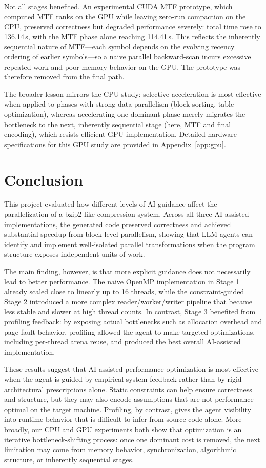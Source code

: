 \documentclass[conference]{IEEEtran}
\begin{document}
Not all stages benefited. An experimental CUDA MTF prototype, which computed MTF ranks on the GPU while leaving zero-run compaction on the CPU, preserved correctness but degraded performance severely: total time rose to 136.14\,s, with the MTF phase alone reaching 114.41\,s. This reflects the inherently sequential nature of MTF---each symbol depends on the evolving recency ordering of earlier symbols---so a naive parallel backward-scan incurs excessive repeated work and poor memory behavior on the GPU. The prototype was therefore removed from the final path.

The broader lesson mirrors the CPU study: selective acceleration is most effective when applied to phases with strong data parallelism (block sorting, table optimization), whereas accelerating one dominant phase merely migrates the bottleneck to the next, inherently sequential stage (here, MTF and final encoding), which resists efficient GPU implementation. Detailed hardware specifications for this GPU study are provided in Appendix~\ref{app:gpu}.

\section{Conclusion}
This project evaluated how different levels of AI guidance affect the parallelization of a bzip2-like compression system. Across all three AI-assisted implementations, the generated code preserved correctness and achieved substantial speedup from block-level parallelism, showing that LLM agents can identify and implement well-isolated parallel transformations when the program structure exposes independent units of work.

The main finding, however, is that more explicit guidance does not necessarily lead to better performance. The naive OpenMP implementation in Stage 1 already scaled close to linearly up to 16 threads, while the constraint-guided Stage 2 introduced a more complex reader/worker/writer pipeline that became less stable and slower at high thread counts. In contrast, Stage 3 benefited from profiling feedback: by exposing actual bottlenecks such as allocation overhead and page-fault behavior, profiling allowed the agent to make targeted optimizations, including per-thread arena reuse, and produced the best overall AI-assisted implementation.

These results suggest that AI-assisted performance optimization is most effective when the agent is guided by empirical system feedback rather than by rigid architectural prescriptions alone. Static constraints can help ensure correctness and structure, but they may also encode assumptions that are not performance-optimal on the target machine. Profiling, by contrast, gives the agent visibility into runtime behavior that is difficult to infer from source code alone. More broadly, our CPU and GPU experiments both show that optimization is an iterative bottleneck-shifting process: once one dominant cost is removed, the next limitation may come from memory behavior, synchronization, algorithmic structure, or inherently sequential stages.
\end{document}
